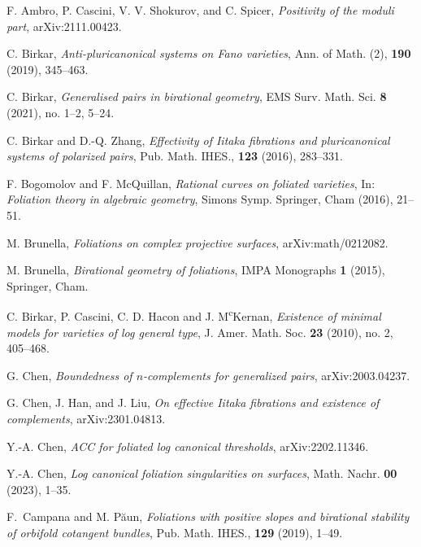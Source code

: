 \documentclass[11pt]{amsart}
\numberwithin{equation}{section}
\theoremstyle{definition}
\theoremstyle{definition}
\theoremstyle{definition}
\begin{document}
\begin{thebibliography}{99}

   F. Ambro, P. Cascini, V. V. Shokurov, and C. Spicer, \textit{Positivity of the moduli part}, arXiv:2111.00423.

   C. Birkar, \textit{Anti-pluricanonical systems on Fano varieties}, Ann. of Math. (2), \textbf{190} (2019), 345--463.

   C. Birkar, \textit{Generalised pairs in birational geometry}, EMS Surv. Math. Sci. \textbf{8} (2021), no. 1--2, 5--24.

   C. Birkar and D.-Q. Zhang, \textit{Effectivity of Iitaka fibrations and pluricanonical systems of polarized pairs}, Pub. Math. IHES., \textbf{123} (2016), 283--331.

   F. Bogomolov and F. McQuillan, \textit{Rational curves on foliated varieties}, In: \textit{Foliation theory in algebraic
    geometry}, Simons Symp. Springer, Cham (2016), 21--51.

   M. Brunella, \textit{Foliations on complex projective surfaces}, arXiv:math/0212082.


   M. Brunella, \textit{Birational geometry of foliations}, IMPA Monographs \textbf{1} (2015), Springer, Cham.

  C. Birkar, P. Cascini, C. D. Hacon and J. M\textsuperscript{c}Kernan, \textit{Existence of minimal models for varieties of log general type}, J. Amer. Math. Soc. \textbf{23} (2010), no. 2, 405--468.

   G. Chen, \textit{Boundedness of $n$-complements for generalized pairs}, arXiv:2003.04237.


   G. Chen, J. Han, and J. Liu, \textit{On effective Iitaka fibrations and existence of complements}, arXiv:2301.04813.

   Y.-A. Chen, \textit{ACC for foliated log canonical thresholds}, arXiv:2202.11346.

   Y.-A. Chen, \textit{Log canonical foliation singularities on surfaces}, Math. Nachr. \textbf{00} (2023), 1--35.

   F.~Campana and M. P\u{a}un, \textit{Foliations with positive slopes and birational stability of orbifold cotangent bundles}, Pub. Math. IHES., \textbf{129} (2019), 1--49.


\end{thebibliography}
\end{document}
